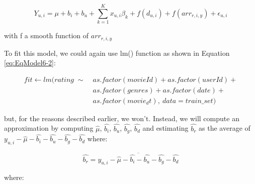 \documentclass[
]{article}
\begin{document}
\label{eq:EqModel6-1} \begin{equation}
  Y_{u,i} = \mu + b_{i} + b_{u} + \sum_{k=1}^Kx_{u,i}\beta_k + f(d_{u,i}) + f(arr_{r,i,y}) + \epsilon_{u,i}
\end{equation}

\begin{center}
with f a smooth function of $arr_{r,i,y}$
\end{center}

To fit this model, we could again use lm() function as shown in Equation
\ref{eq:EqModel6-2}:

%
\par

\label{eq:EqModel6-2} \begin{equation}
\begin{split}
  fit \leftarrow lm(rating \; \sim \; & as.factor(movieId) + as.factor(userId) + \\ 
  & as.factor(genres) + as.factor(date) + \\ 
  & as.factor(movie_dt), \: data = train\_{}set)
\end{split}
\end{equation}

but, for the reasons described earlier, we won't. Instead, we will
compute an approximation by computing \(\hat{\mu}\), \(\hat{b_{i}}\),
\(\hat{b_{u}}\), \(\hat{b_{g}}\), \(\hat{b_{d}}\) and estimating
\(\hat{b_{r}}\) as the average of
\(y_{u,i}-\hat{\mu}-\hat{b_{i}}-\hat{b_{u}}-\hat{b_{g}}-\hat{b_{d}}\)
where:\\

%
\par

\label{eq:EqModel6-3} \begin{equation}
  \hat{b_{r}} = \overline{y_{u,i} - \hat{\mu} - \hat{b_{i}} - \hat{b_{u}}  - \hat{b_{g}} - \hat{b_{d}}}
\end{equation}

where:

%
\par
\end{document}
